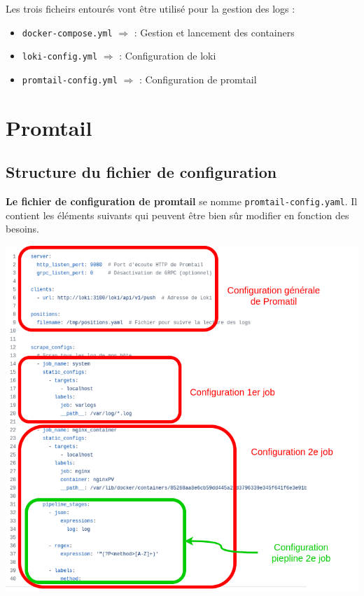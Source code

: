 \documentclass[french, 12pt]{article}%
\newcommand{\itemE}{\item[$\bullet$]}
\begin{document}
Les trois ficheirs entourés vont être utilisé pour la gestion des logs : 
\begin{itemize}
\itemE \verb?docker-compose.yml? $\Rightarrow$ : Gestion et lancement des containers 
\itemE \verb?loki-config.yml? $\Rightarrow$ : Configuration de loki
\itemE \verb?promtail-config.yml? $\Rightarrow$  : Configuration de promtail
\end{itemize}




 
 \section{Promtail}
 \subsection{Structure du fichier de configuration}
\textbf{Le fichier de configuration de promtail} se nomme \verb?promtail-config.yaml?. Il contient les éléments suivants qui peuvent être bien sûr modifier en fonction des besoins. 

\begin{center}
\includegraphics[scale=0.45]{./ressource/promtailConf.drawio.png}
\end{center}
\end{document}
